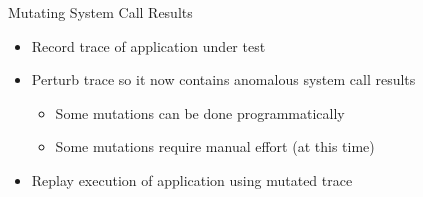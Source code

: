 \documentclass[pdf]{beamer}
\begin{document}
\begin{frame}{Mutating System Call Results}
  \begin{itemize}
  \item{Record trace of application under test}
  \item{Perturb trace so it now contains anomalous system call results}
    \begin{itemize}
    \item{Some mutations can be done programmatically}
    \item{Some mutations require manual effort (at this time)}
    \end{itemize}
  \item{Replay execution of application using mutated trace}
  \end{itemize}
\end{frame}
\end{document}
